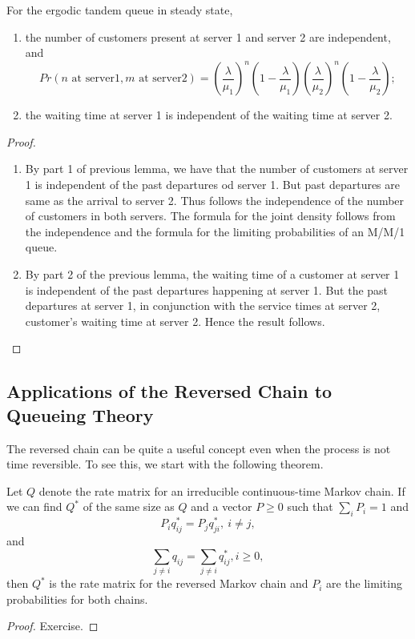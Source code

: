\documentclass[a4paper,10pt]{article}
\begin{document}
\begin{thm}
For the ergodic tandem queue in steady state,
\begin{enumerate}
\item the number of customers present at server 1 and server 2 are independent, and
\begin{equation*}
Pr(n \text{~at server}1, m \text{~at server}2)={(\frac{\lambda}{\mu_1})}^n(1-\frac{\lambda}{\mu_1}){(\frac{\lambda}{\mu_2})}^n(1-\frac{\lambda}{\mu_2});
\end{equation*}
\item the waiting time at server 1 is independent of the waiting time at server 2.
\end{enumerate}
\end{thm}
\begin{proof}
\begin{enumerate}
\item By part 1 of previous lemma, we have that the number of customers at server 1 is independent of the past departures od server 1. But past departures are same as the arrival to server 2. Thus follows the independence of the number of customers in both servers. The formula for the joint density follows from the independence and the formula for the limiting probabilities of an M/M/1 queue. 
\item By part 2 of the previous lemma, the waiting time of a customer at server 1 is independent of the past departures happening at server 1. But the past departures at server 1, in conjunction with the service times at server 2, customer's waiting time at server 2. Hence the result follows.
\end{enumerate}
\end{proof}
\subsection{Applications of the Reversed Chain to Queueing Theory}
The reversed chain can be quite a useful concept even when the process is not time reversible. To see this, we start with the following theorem. 
\begin{thm}
Let $Q$ denote the rate matrix for an irreducible continuous-time Markov chain. If we can find $Q^*$ of the same size as $Q$ and a vector $P \geq 0$ such that $\sum_i P_i =1$ and 
\begin{equation*}
P_{i}q_{ij}^*=P_jq_{ji}^*, ~ i \neq j,
\end{equation*} and
\begin{equation*}
\sum_{j \neq i}q_{ij}=\sum_{j \neq i}q_{ij}^*, i \geq 0,
\end{equation*} 
then $Q^*$ is the rate matrix for the reversed Markov chain and $P_i$ are the limiting probabilities for both  chains.
\end{thm}
\begin{proof}
Exercise.
\end{proof}
\end{document}
